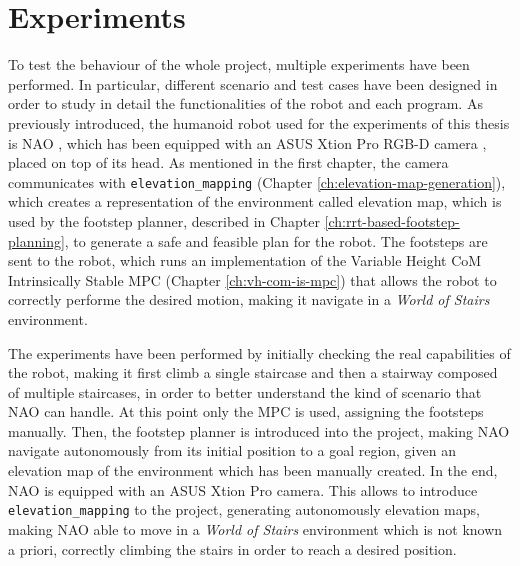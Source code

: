 \chapter{Experiments}
\label{ch:experiments}

To test the behaviour of the whole project, multiple experiments have been 
performed. In particular, different scenario and test cases have been designed 
in order to study in detail the functionalities of the robot and each program.
As previously introduced, the humanoid robot used for the experiments of this 
thesis is NAO \cite{NAOdesign}, which has been equipped with an ASUS Xtion 
Pro RGB-D camera \cite{ASUSXtionProWebsite}, placed on top of its head.
As mentioned in the first chapter, the camera communicates with
\texttt{elevation\_mapping} (Chapter \ref{ch:elevation-map-generation}),
which creates a representation of the environment
called elevation map, which is used by the footstep planner, described in 
Chapter \ref{ch:rrt-based-footstep-planning}, to generate a safe and feasible 
plan for the robot. The footsteps are sent to the robot, which runs an 
implementation of the Variable Height CoM Intrinsically Stable MPC (Chapter 
\ref{ch:vh-com-is-mpc}) that allows the robot to correctly performe the 
desired motion, making it navigate in a \textit{World 
of Stairs} environment.

The experiments have been performed by initially checking the real capabilities 
of the robot, making it first climb a single staircase and then a stairway 
composed of multiple staircases, in order to better understand 
the kind of scenario that NAO can handle. At this point only the MPC is 
used, assigning the footsteps manually. Then, the footstep planner is 
introduced into the project, making NAO navigate autonomously from its initial 
position to a goal region, given an elevation map of the environment which has 
been manually created. In the end, NAO is equipped with an ASUS Xtion Pro 
camera. This allows to introduce \texttt{elevation\_mapping} to the project,
generating autonomously elevation maps, making NAO able to move in 
a \textit{World of Stairs} environment which is not known a priori,
correctly climbing the stairs in order to reach a desired position.

